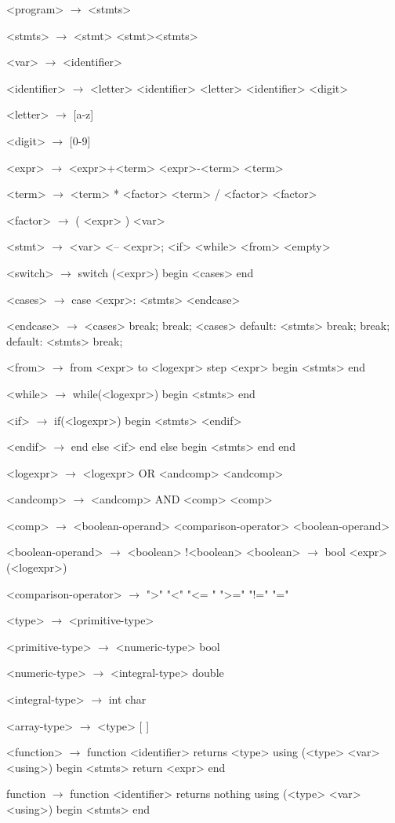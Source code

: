 \documentclass{article}
\begin{document}
\begin{grammar}
<program> $\rightarrow$ <stmts>

<stmts> $\rightarrow$ <stmt>
	\alt <stmt><stmts>

<var> $\rightarrow$ <identifier>

<identifier> $\rightarrow$ <letter>
	\alt<identifier> <letter>
	\alt<identifier> <digit>

<letter> $\rightarrow$ [a-z]
	\alt [A-Z]

<digit> $\rightarrow$ [0-9]

<expr> $\rightarrow$ <expr>+<term>
	\alt<expr>-<term>
	\alt<term>

<term> $\rightarrow$ <term> * <factor>
	\alt <term> / <factor>
	\alt <factor>

<factor> $\rightarrow$ ( <expr> )
	\alt <var>

<stmt> $\rightarrow$ <var> <-- <expr>;
	\alt <if>
	\alt <while>
	\alt <from>
	\alt <empty>

<switch> $\rightarrow$ switch (<expr>)
		begin
			<cases>
		end

<cases> $\rightarrow$ case <expr>:
			<stmts>
		<endcase>
		
<endcase> $\rightarrow$ <cases>
		\alt break;
		\alt break;
		<cases>
		\alt default:
			<stmts>
			break;
		\alt break;
		default:
			<stmts>
			break;

<from> $\rightarrow$ from <expr> to <logexpr> step <expr>
	begin
		<stmts>
	end 

<while> $\rightarrow$ while(<logexpr>)
		begin
			<stmts>
		end

<if> $\rightarrow$ if(<logexpr>)
	begin
		<stmts>
	<endif>

<endif> $\rightarrow$ end
	else <if>
	\alt end
	else
	begin
		<stmts>
	end
	\alt end

<logexpr> $\rightarrow$ <logexpr> OR <andcomp>
		\alt <andcomp>

<andcomp> $\rightarrow$ <andcomp> AND <comp>

<comp> $\rightarrow$ <boolean-operand> <comparison-operator> <boolean-operand>

<boolean-operand> $\rightarrow$ <boolean>
		\alt !<boolean>
<boolean> $\rightarrow$ bool
		\alt (<logexpr>)

<comparison-operator> $\rightarrow$ ">"
				\alt "<"
				\alt "<= "
				\alt ">="
				\alt "!="
				\alt "="

<type> $\rightarrow$ <primitive-type>

<primitive-type> $\rightarrow$ <numeric-type>
\alt bool

<numeric-type> $\rightarrow$ <integral-type>
\alt double

<integral-type> $\rightarrow$ int
\alt char

<array-type> $\rightarrow$ <type> [ ]


<function> $\rightarrow$  function <identifier> returns <type> using (<type> <var> <using>)
begin
	<stmts>
	return <expr>
end

\alt function $\rightarrow$ function <identifier> returns nothing using (<type> <var> <using>)
begin
	<stmts>
end


\end{grammar}
\end{document}
